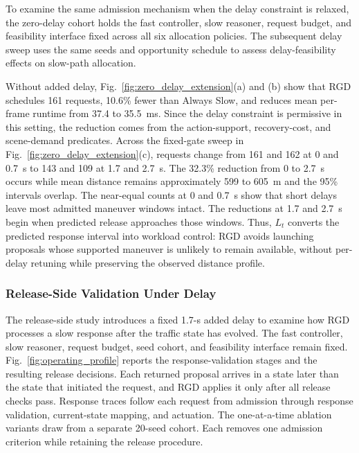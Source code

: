 \documentclass[letterpaper,journal]{IEEEtran}
\begin{document}
To examine the same admission mechanism when the delay constraint is relaxed,
the zero-delay cohort holds the fast controller, slow reasoner, request
budget, and feasibility interface fixed across all six allocation policies.
The subsequent delay sweep uses the same seeds and opportunity schedule to
assess delay-feasibility effects on slow-path allocation.

Without added delay, Fig.~\ref{fig:zero_delay_extension}(a) and (b) show that
RGD schedules 161 requests, 10.6\% fewer than Always Slow, and reduces mean
per-frame runtime from 37.4 to 35.5~ms. Since the delay constraint is permissive
in this setting, the reduction comes from the action-support, recovery-cost,
and scene-demand predicates. Across the fixed-gate sweep in
Fig.~\ref{fig:zero_delay_extension}(c), requests change from 161 and 162 at
0 and 0.7~s to 143 and 109 at 1.7 and 2.7~s. The 32.3\% reduction from 0 to
2.7~s occurs while mean distance remains approximately 599 to 605~m and the
95\% intervals overlap. The near-equal counts at 0 and 0.7~s show that short
delays leave most admitted maneuver windows intact. The reductions at 1.7 and
2.7~s begin when predicted release approaches those windows. Thus, $L_t$
converts the predicted response interval into workload control: RGD avoids
launching proposals whose supported maneuver is unlikely to remain available,
without per-delay retuning while preserving the observed distance profile.
\subsubsection{Release-Side Validation Under Delay}
The release-side study introduces a fixed 1.7-s added delay to examine how RGD
processes a slow response after the traffic state has evolved. The fast
controller, slow reasoner, request budget, seed cohort, and feasibility
interface remain fixed.
Fig.~\ref{fig:operating_profile} reports the response-validation stages and
the resulting release decisions. Each returned proposal arrives in a state
later than the state that initiated the request, and RGD applies it only after
all release checks pass. Response traces follow each request from admission
through response validation, current-state mapping, and actuation. The
one-at-a-time ablation variants draw from a separate 20-seed cohort. Each
removes one admission criterion while retaining the release procedure.
\end{document}
